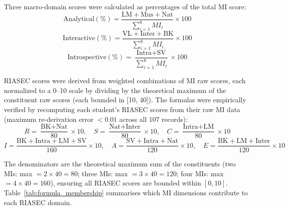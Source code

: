 \documentclass[12pt, a4paper]{article}
\begin{document}
Three macro-domain scores were calculated as percentages of the total MI score:
\begin{equation}
\text{Analytical}(\%) = \frac{\text{LM} + \text{Mus} + \text{Nat}}{\sum_{i=1}^{8} MI_i} \times 100
\end{equation}
\begin{equation}
\text{Interactive}(\%) = \frac{\text{VL} + \text{Inter} + \text{BK}}{\sum_{i=1}^{8} MI_i} \times 100
\end{equation}
\begin{equation}
\text{Introspective}(\%) = \frac{\text{Intra} + \text{SV}}{\sum_{i=1}^{8} MI_i} \times 100
\end{equation}

RIASEC scores were derived from weighted combinations of MI raw scores, each normalized to a 0--10 scale by dividing by the theoretical maximum of the constituent raw scores (each bounded in [10, 40]). The formulas were empirically verified by recomputing each student's RIASEC scores from their raw MI data (maximum re-derivation error $< 0.01$ across all 107 records):
\begin{equation}
R = \frac{\text{BK} + \text{Nat}}{80} \times 10, \quad
S = \frac{\text{Nat} + \text{Inter}}{80} \times 10, \quad
C = \frac{\text{Intra} + \text{LM}}{80} \times 10
\end{equation}
\begin{equation}
I = \frac{\text{BK} + \text{Intra} + \text{LM} + \text{SV}}{160} \times 10, \quad
A = \frac{\text{SV} + \text{Intra} + \text{Nat}}{120} \times 10, \quad
E = \frac{\text{BK} + \text{LM} + \text{Inter}}{120} \times 10
\end{equation}

The denominators are the theoretical maximum sum of the constituents (two MIs: max $= 2 \times 40 = 80$; three MIs: max $= 3 \times 40 = 120$; four MIs: max $= 4 \times 40 = 160$), ensuring all RIASEC scores are bounded within $[0, 10]$. Table~\ref{tab:formula_membership} summarises which MI dimensions contribute to each RIASEC domain.
\end{document}
